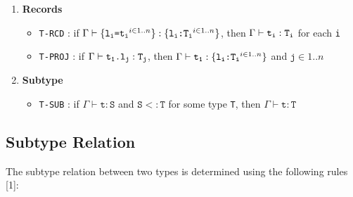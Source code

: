 \documentclass[fleqn, 11pt]{article}
\begin{document}
\begin{enumerate}
    \item \textbf{Records}
    \begin{itemize}
        \item \texttt{T-RCD} : if $\Gamma \vdash \{\texttt{l\textsubscript{i}=t\textsubscript{i}}^{i \in 1..n}\} : 
        \{\texttt{l\textsubscript{i}:T\textsubscript{i}}^{i \in 1..n}\}$, then 
        $\Gamma \vdash \texttt{t\textsubscript{i}} : \texttt{T\textsubscript{i}}$ for each \texttt{i}
        \item \texttt{T-PROJ} : if $\Gamma \vdash \texttt{t\textsubscript{1}.l\textsubscript{j}} : \texttt{T\textsubscript{j}}$, 
        then $\Gamma \vdash \texttt{t\textsubscript{1}} : \{\texttt{l\textsubscript{i}:T\textsubscript{i}}^{i \in 1..n}\}$ and 
        $\texttt{j} \in 1..n$
    \end{itemize}

    \item \textbf{Subtype}
    \begin{itemize}
        \item \texttt{T-SUB} : if $\Gamma \vdash \texttt{t} : \texttt{S}$ and $\texttt{S} <: \texttt{T}$ for some type \texttt{T}, then 
        $\Gamma \vdash \texttt{t} : \texttt{T}$
    \end{itemize}
\end{enumerate}

\subsection{Subtype Relation}

The subtype relation between two types is determined using the following rules [1]:
\end{document}
